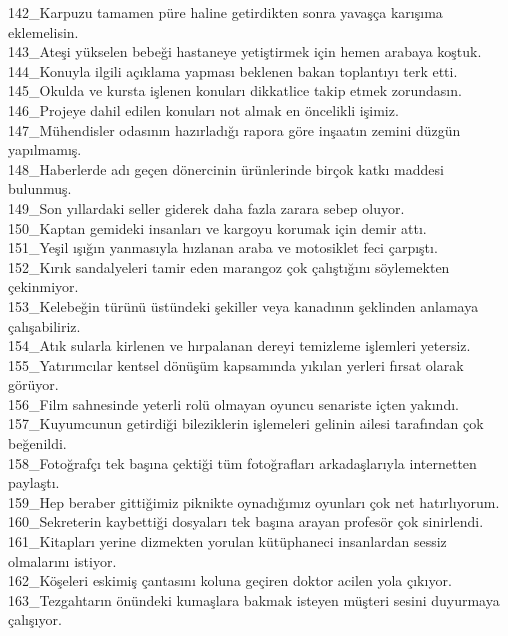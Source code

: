 \begin{myparindent}{0pt}
142\_Karpuzu tamamen püre haline getirdikten sonra yavaşça karışıma eklemelisin. \\
143\_Ateşi yükselen bebeği hastaneye yetiştirmek için hemen arabaya koştuk. \\
144\_Konuyla ilgili açıklama yapması beklenen bakan toplantıyı terk etti. \\
145\_Okulda ve kursta işlenen konuları dikkatlice takip etmek zorundasın. \\
146\_Projeye dahil edilen konuları not almak en öncelikli işimiz. \\
147\_Mühendisler odasının hazırladığı rapora göre inşaatın zemini düzgün yapılmamış. \\
148\_Haberlerde adı geçen dönercinin ürünlerinde birçok katkı maddesi bulunmuş. \\
149\_Son yıllardaki seller giderek daha fazla zarara sebep oluyor. \\
150\_Kaptan gemideki insanları ve kargoyu korumak için demir attı. \\
151\_Yeşil ışığın yanmasıyla hızlanan araba ve motosiklet feci çarpıştı. \\
152\_Kırık sandalyeleri tamir eden marangoz çok çalıştığını söylemekten çekinmiyor. \\
153\_Kelebeğin türünü üstündeki şekiller veya kanadının şeklinden anlamaya çalışabiliriz. \\
154\_Atık sularla kirlenen ve hırpalanan dereyi temizleme işlemleri yetersiz. \\
155\_Yatırımcılar kentsel dönüşüm kapsamında yıkılan yerleri fırsat olarak görüyor. \\
156\_Film sahnesinde yeterli rolü olmayan oyuncu senariste içten yakındı. \\
157\_Kuyumcunun getirdiği bileziklerin işlemeleri gelinin ailesi tarafından çok beğenildi. \\
158\_Fotoğrafçı tek başına çektiği tüm fotoğrafları arkadaşlarıyla internetten paylaştı. \\
159\_Hep beraber gittiğimiz piknikte oynadığımız oyunları çok net hatırlıyorum. \\
160\_Sekreterin kaybettiği dosyaları tek başına arayan profesör çok sinirlendi. \\
161\_Kitapları yerine dizmekten yorulan kütüphaneci insanlardan sessiz olmalarını istiyor. \\
162\_Köşeleri eskimiş çantasını koluna geçiren doktor acilen yola çıkıyor. \\
163\_Tezgahtarın önündeki kumaşlara bakmak isteyen müşteri sesini duyurmaya çalışıyor. \\

\end{myparindent}

